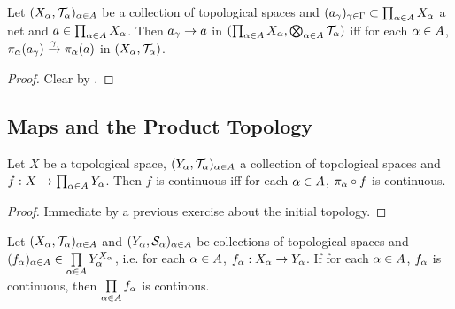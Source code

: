 \documentclass{book}
\begin{document}
	\begin{ex} 
		Let $(X_{\alpha}, \mathcal{T}_{\alpha})_{\alpha \in A}$ be a collection of topological spaces and $(a_{\gamma})_{\gamma \in \Gamma} \subset \prod_{\alpha \in A} X_{\alpha}$ a net and $a \in \prod_{\alpha \in A} X_{\alpha}$. Then $a_{\gamma} \rightarrow a$ in $(\prod_{\alpha \in A} X_{\alpha}, \bigotimes_{\alpha \in A} \mathcal{T}_{\alpha})$ iff for each $\alpha \in A$, $\pi_{\alpha}(a_{\gamma}) \xrightarrow{\gamma} \pi_{\alpha}(a)$ in $(X_{\alpha}, \mathcal{T}_{\alpha})$. 
	\end{ex}

	\begin{proof} 
		Clear by .
	\end{proof}




















	
	
	
	
	
	
	
	
	\subsection{Maps and the Product Topology}
	
	\begin{ex}  
		Let $X$ be a topological space, $(Y_{\alpha}, \mathcal{T}_{\alpha})_{\alpha \in A}$ a collection of topological spaces and $f: X \rightarrow \prod_{\alpha \in A}Y_{\alpha}$. Then $f$ is continuous iff for each $\alpha \in A$, $\pi_{\alpha} \circ f$ is continuous.
	\end{ex}

	\begin{proof}
		Immediate by a previous exercise about the initial topology.
	\end{proof}
	
	\begin{ex} 
		Let $(X_{\alpha}, \mathcal{T}_{\alpha})_{\alpha \in A}$ and $(Y_{\alpha}, \mathcal{S}_{\alpha})_{\alpha \in A}$ be collections of topological spaces and $(f_{\alpha})_{\alpha \in A} \in \prod\limits_{\alpha \in A} Y_{\alpha}^{X_{\alpha}}$, i.e. for each $\alpha \in A$, $f_{\alpha}:X_{\alpha} \rightarrow Y_{\alpha}$. If for each $\alpha \in A$, $f_{\alpha}$ is continuous, then $\prod\limits_{\alpha \in A} f_{\alpha}$ is continous.
	\end{ex}
\end{document}
